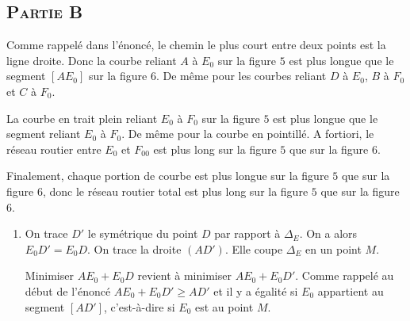 \documentclass[10pt,a4paper]{article}
\begin{document}
\subsection{\textsc{Partie B}}
\begin{enumerate}
\item Comme rappelé dans l'énoncé, le chemin le plus court entre deux points est la ligne droite. Donc la courbe reliant $A$ à $E_0$ sur la figure $5$ est
 plus longue que le segment $[AE_0]$ sur la figure $6$. De même pour les courbes reliant $D$ à $E_0$, $B$ à $F_0$ et $C$ à $F_0$.

La courbe en trait plein reliant $E_0$ à $F_0$ sur la figure $5$ est plus longue que le segment reliant $E_0$ à $F_0$. De même pour la courbe en pointillé. A
fortiori, le réseau routier entre $E_0$ et $F_00$ est plus long sur la figure $5$ que sur la figure $6$.

Finalement, chaque portion de courbe est plus longue sur la figure $5$ que sur la figure $6$, donc le réseau routier total est plus long sur la figure $5$ que
sur la figure $6$.
\vspace{0.3cm}

\begin{minipage}{0.65\textwidth}
\item
\begin{enumerate}
\item 
On trace $D'$ le symétrique du point $D$ par rapport à $\Delta_E$. On a alors $E_0D'=E_0D$. On trace la droite $(AD')$. Elle coupe $\Delta_E$ en un point $M$.

Minimiser $AE_0+E_0D$ revient à minimiser $AE_0+E_0D'$. Comme rappelé au début de l'énoncé $AE_0+E_0D'\geqslant AD'$ et il y a égalité si $E_0$ appartient au
segment $[AD']$, c'est-à-dire si $E_0$ est au point $M$.


\end{enumerate}
\end{minipage}
\end{enumerate}
\end{document}
